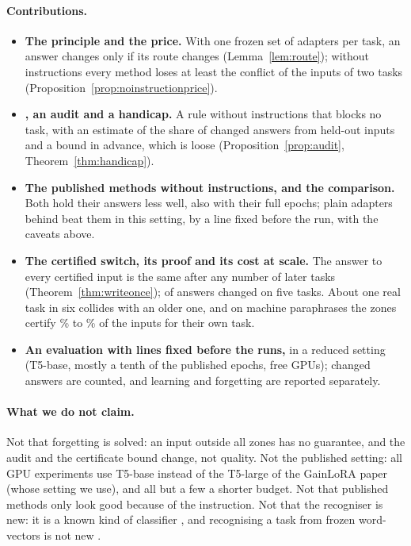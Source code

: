 \paragraph{Contributions.}
\begin{itemize}
  \item \textbf{The principle and the price.} With one frozen set of adapters per task, an answer
  changes only if its route changes (Lemma~\ref{lem:route}); without instructions every method
  loses at least the conflict of the inputs of two tasks (Proposition~\ref{prop:noinstructionprice}).
  \item \textbf{\recog{}, an audit and a handicap.} A rule without instructions that blocks no task,
  with an estimate of the share of changed answers from held-out inputs and a bound in advance,
  which is loose (Proposition~\ref{prop:audit}, Theorem~\ref{thm:handicap}).
  \item \textbf{The published methods without instructions, and the comparison.} Both hold their
  answers less well, also with their full epochs; plain adapters behind \recog{} beat them in this setting, by a line fixed
  before the run, with the caveats above.
  \item \textbf{The certified switch, its proof and its cost at scale.} The answer to every certified
  input is the same after any number of later tasks (Theorem~\ref{thm:writeonce}); \FiveCertChanged{}
  of \FiveCertCompared{} answers changed on five tasks. About one real task in six collides with an older one, and on
  machine paraphrases the zones certify \WidenRefTfivePLow{}\% to \WidenRefTfivePHigh{}\% of the inputs
  for their own task.
  \item \textbf{An evaluation with lines fixed before the runs,} in a reduced setting (T5-base,
  mostly a tenth of the published epochs, free GPUs); changed answers are counted, and learning and
  forgetting are reported separately.
\end{itemize}

\paragraph{What we do not claim.} Not that forgetting is solved: an input outside
all zones has no guarantee, and the audit and the certificate bound change, not quality. Not the published setting: all GPU experiments use
T5-base instead of the T5-large of the GainLoRA paper (whose setting we use), and all but a few a shorter budget. Not that published methods only look good because of the
instruction. Not
that the recogniser is new: it is a known kind of classifier \citep{mcdonnell2023ranpac,zhuang2022acil},
and recognising a task from frozen word-vectors is not new \citep{latentlora2026}.
